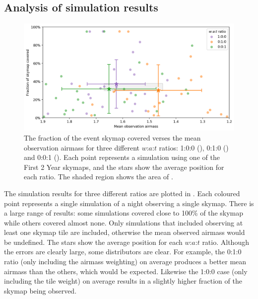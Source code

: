 
\subsection{Analysis of simulation results}
\label{sec:scheduler_sim_analysis}
\begin{colsection}

\begin{figure}[t]
    \begin{center}
        \includegraphics[width=\linewidth]{images/sched_sim1.png}
    \end{center}
    \caption[Skymap coverage verses mean airmass for different $w$:$a$:$t$ ratios]{
        The fraction of the event skymap covered verses the mean observation airmass for three different $w$:$a$:$t$ ratios: 1:0:0 (), 0:1:0 () and 0:0:1 (). Each point represents a simulation using one of the First 2 Year skymaps, and the stars show the average position for each ratio. The shaded region shows the area of .
    }\label{fig:scheduler_sim_results1}
\end{figure}

The simulation results for three different ratios are plotted in . Each coloured point represents a single simulation of a night observing a single skymap. There is a large range of  results: some simulations covered close to 100\% of the skymap while others covered almost none. Only simulations that included observing at least one skymap tile are included, otherwise the mean observed airmass would be undefined. The stars show the average position for each $w$:$a$:$t$ ratio. Although the errors are clearly large, some distributors are clear. For example, the 0:1:0 ratio (only including the airmass weighting) on average produces a better mean airmass than the others, which would be expected. Likewise the 1:0:0 case (only including the tile weight) on average results in a slightly higher fraction of the skymap being observed.


\end{colsection}
